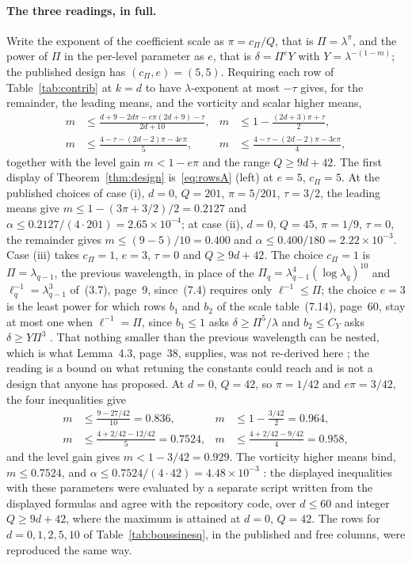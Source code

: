 \documentclass[11pt]{article}
\theoremstyle{remark}
\newcommand{\ev}[1]{\hspace{0.2em}{\small\textsf{[#1]}}}
\begin{document}
\paragraph{The three readings, in full.} Write the exponent of the coefficient scale as
$\pi=c_{\Pi}/Q$, that is $\Pi=\lambda^{\pi}$, and the power of $\Pi$ in the per-level parameter as
$e$, that is $\delta=\Pi^{e}Y$ with $Y=\lambda^{-(1-m)}$; the published design has
$(c_{\Pi},e)=(5,5)$. Requiring each row of Table~\ref{tab:contrib} at $k=d$ to have $\lambda$-exponent
at most $-\tau$ gives, for the remainder, the leading means, and the vorticity and scalar higher means,
\begin{align}
m&\le\frac{d+9-2d\pi-e\pi(2d+9)-\tau}{2d+10}, &
m&\le1-\frac{(2d+3)\pi+\tau}{2},\label{eq:rowsA}\\
m&\le\frac{4-\tau-(2d-2)\pi-4e\pi}{5}, &
m&\le\frac{4-\tau-(2d-2)\pi-3e\pi}{4},\label{eq:rowsB}
\end{align}
together with the level gain $m<1-e\pi$ and the range $Q\ge9d+42$. The first display of
Theorem~\ref{thm:design} is~\eqref{eq:rowsA} (left) at $e=5$, $c_{\Pi}=5$. At the published choices of
case (i), $d=0$, $Q=201$, $\pi=5/201$, $\tau=3/2$, the leading means give
$m\le1-(3\pi+3/2)/2=0.2127$ and $\alpha\le0.2127/(4\cdot201)=2.65\times10^{-4}$; at case (ii),
$d=0$, $Q=45$, $\pi=1/9$, $\tau=0$, the remainder gives $m\le(9-5)/10=0.400$ and
$\alpha\le0.400/180=2.22\times10^{-3}$. Case (iii) takes $c_{\Pi}=1$, $e=3$, $\tau=0$ and
$Q\ge9d+42$. The choice $c_{\Pi}=1$ is $\Pi=\lambda_{q-1}$, the previous wavelength, in place of the
$\Pi_{q}=\lambda_{q-1}^{4}(\log\lambda_{q})^{10}$ and $\ell_{q}^{-1}=\lambda_{q-1}^{3}$ of~(3.7), page~9,
since~(7.4) requires only $\ell^{-1}\le\Pi$; the choice $e=3$ is the least power for
which rows $b_{1}$ and $b_{2}$ of the scale table~(7.14), page~60, stay at most one when
$\ell^{-1}=\Pi$, since $b_{1}\le1$ asks $\delta\ge\Pi^{5}/\lambda$ and $b_{2}\le C_{Y}$ asks
$\delta\ge Y\Pi^{3}$ \ev{V}. That nothing smaller than the previous wavelength can be nested, which is
what Lemma~4.3, page~38, supplies, was not re-derived here \ev{U}; the reading is a bound on what
retuning the constants could reach and is not a design that anyone has proposed. At $d=0$, $Q=42$, so
$\pi=1/42$ and $e\pi=3/42$, the four inequalities give
\begin{align*}
m&\le\frac{9-27/42}{10}=0.836, & m&\le1-\frac{3/42}{2}=0.964,\\
m&\le\frac{4+2/42-12/42}{5}=0.7524, & m&\le\frac{4+2/42-9/42}{4}=0.958,
\end{align*}
and the level gain gives $m<1-3/42=0.929$. The vorticity higher means bind, $m\le0.7524$, and
$\alpha\le0.7524/(4\cdot42)=4.48\times10^{-3}$ \ev{MV}: the displayed inequalities with these
parameters were evaluated by a separate script written from the displayed formulas and agree with the
repository code, over $d\le60$ and integer $Q\ge9d+42$, where the maximum is attained at $d=0$,
$Q=42$. The rows for $d=0,1,2,5,10$ of Table~\ref{tab:boussinesq}, in the published and free
columns, were reproduced the same way.
\end{document}
